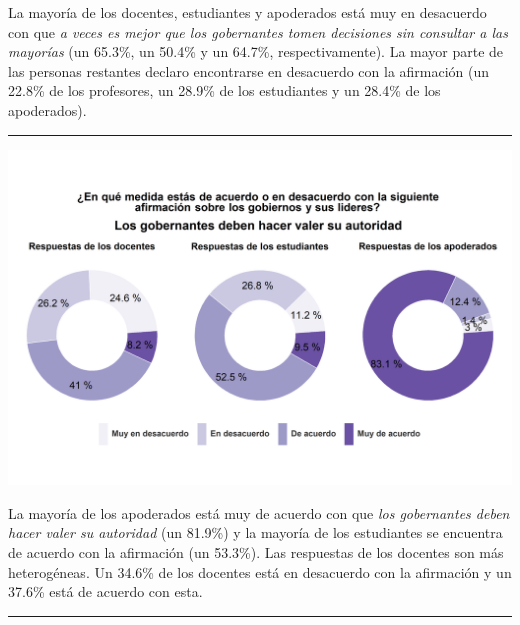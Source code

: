 \documentclass[
  14pt,
]{book}
\let\origfigure\figure
\let\endorigfigure\endfigure
\renewenvironment{figure}[1][2] {
  \expandafter\origfigure\expandafter[H]
} {
  \endorigfigure
}
\begin{document}
La mayoría de los docentes, estudiantes y apoderados está muy en desacuerdo con que \emph{a veces es mejor que los gobernantes tomen decisiones sin consultar a las mayorías} (un 65.3\%, un 50.4\% y un 64.7\%, respectivamente). La mayor parte de las personas restantes declaro encontrarse en desacuerdo con la afirmación (un 22.8\% de los profesores, un 28.9\% de los estudiantes y un 28.4\% de los apoderados).

\begin{center}\rule{0.5\linewidth}{0.5pt}\end{center}

\begin{figure}[!ht]

{\centering \includegraphics[width=0.8\linewidth,]{images/graph_aut5} 

}

\caption{Los gobernantes deben hacer valer su autoridad}\label{fig:unnamed-chunk-46}
\end{figure}

La mayoría de los apoderados está muy de acuerdo con que \emph{los gobernantes deben hacer valer su autoridad} (un 81.9\%) y la mayoría de los estudiantes se encuentra de acuerdo con la afirmación (un 53.3\%). Las respuestas de los docentes son más heterogéneas. Un 34.6\% de los docentes está en desacuerdo con la afirmación y un 37.6\% está de acuerdo con esta.

\begin{center}\rule{0.5\linewidth}{0.5pt}\end{center}
\end{document}
